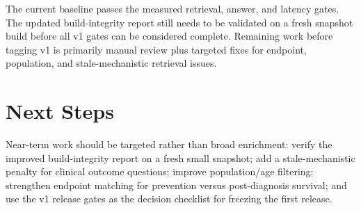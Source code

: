 \documentclass{article}
\begin{document}
The current baseline passes the measured retrieval, answer, and latency gates. The updated build-integrity report still needs to be validated on a fresh snapshot build before all v1 gates can be considered complete. Remaining work before tagging v1 is primarily manual review plus targeted fixes for endpoint, population, and stale-mechanistic retrieval issues.

\section{Next Steps}

Near-term work should be targeted rather than broad enrichment: verify the improved build-integrity report on a fresh small snapshot; add a stale-mechanistic penalty for clinical outcome questions; improve population/age filtering; strengthen endpoint matching for prevention versus post-diagnosis survival; and use the v1 release gates as the decision checklist for freezing the first release.



\end{document}

